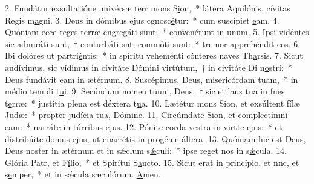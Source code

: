 2. Fundátur exsultatióne univérsæ terr mons S\uline{i}on,~* látera Aquilónis, cívitas Regis m\uline{a}gni.
3. Deus in dómibus ejus cgnosc\uline{é}tur:~* cum suscípiet \uline{e}am.
4. Quóniam ecce reges terræ cngreg\uline{á}ti sunt:~* convenérunt in \uline{u}num.
5. Ipsi vidéntes sic admiráti sunt,~† conturbáti snt, comm\uline{ó}ti sunt:~* tremor apprehéndit \uline{e}os.
6. Ibi dolóres ut partri\uline{é}ntis:~* in spíritu veheménti cónteres naves Th\uline{a}rsis.
7. Sicut audívimus, sic vídimus in civitáte Dómini virtútum,~† in civitáte Di n\uline{o}stri:~* Deus fundávit eam in æt\uline{é}rnum.
8. Suscépimus, Deus, misericórdam t\uline{u}am,~* in médio templi t\uline{u}i.
9. Secúndum nomen tuum, Deus,~† sic et laus tua in fnes t\uline{e}rræ:~* justítia plena est déxtera t\uline{u}a.
10. Lætétur mons Sion, et exsúltent fílæ J\uline{u}dæ:~* propter judícia tua, D\uline{ó}mine.
11. Circúmdate Sion, et complectímni \uline{e}am:~* narráte in túrribus \uline{e}jus.
12. Pónite corda vestra in virtte \uline{e}jus:~* et distribúite domus ejus, ut enarrétis in progénie \uline{á}ltera.
13. Quóniam hic est Deus, Deus noster in ætérnum et in sǽclum s\uline{ǽ}culi:~* ipse reget nos in s\uline{ǽ}cula.
14. Glória Patr, et F\uline{í}lio,~* et Spirítui S\uline{a}ncto.
15. Sicut erat in princípio, et nnc, et s\uline{e}mper,~* et in sǽcula sæculórum. \uline{A}men.
